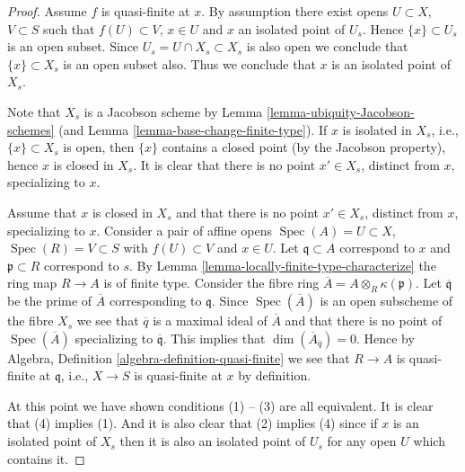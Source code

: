 \documentclass[10pt,a4paper]{amsart}
\theoremstyle{plain}
\theoremstyle{definition}
\theoremstyle{remark}
\numberwithin{equation}{subsection}
\def\Spec{\mathop{\mathrm{Spec}}}
\begin{document}
\begin{proof}
Assume $f$ is quasi-finite at $x$. By assumption there exist opens
$U \subset X$, $V \subset S$ such that $f(U) \subset V$, $x \in U$
and $x$ an isolated point of $U_s$. Hence $\{x\} \subset U_s$ is an open
subset. Since $U_s = U \cap X_s \subset X_s$ is also open we conclude
that $\{x\} \subset X_s$ is an open subset also. Thus we conclude
that $x$ is an isolated point of $X_s$.

\medskip\noindent
Note that $X_s$ is a Jacobson scheme by
Lemma \ref{lemma-ubiquity-Jacobson-schemes}
(and
Lemma \ref{lemma-base-change-finite-type}).
If $x$ is isolated in $X_s$, i.e., $\{x\} \subset X_s$ is open,
then $\{x\}$ contains a closed point (by the Jacobson property), hence
$x$ is closed in $X_s$. It is clear that there is no point $x' \in X_s$,
distinct from $x$, specializing to $x$.

\medskip\noindent
Assume that $x$ is closed in $X_s$ and that there is no point $x' \in X_s$,
distinct from $x$, specializing to $x$. Consider a pair of affine opens
$\Spec(A) = U \subset X$, $\Spec(R) = V \subset S$ with
$f(U) \subset V$ and $x \in U$. Let $\mathfrak q \subset A$ correspond to
$x$ and $\mathfrak p \subset R$ correspond to $s$.
By Lemma \ref{lemma-locally-finite-type-characterize} the ring map
$R \to A$ is of finite type. Consider the fibre ring
$\overline{A} = A \otimes_R \kappa(\mathfrak p)$.
Let $\overline{\mathfrak q}$ be the prime of $\overline{A}$ corresponding
to $\mathfrak q$. Since $\Spec(\overline{A})$ is an open subscheme of
the fibre $X_s$ we see that $\overline{q}$ is a maximal ideal
of $\overline{A}$ and that there is no point of $\Spec(\overline{A})$
specializing to $\overline{\mathfrak q}$.
This implies that $\dim(\overline{A}_{\overline{q}}) = 0$.
Hence by
Algebra, Definition \ref{algebra-definition-quasi-finite}
we see that $R \to A$ is quasi-finite at $\mathfrak q$, i.e.,
$X \to S$ is quasi-finite at $x$ by definition.

\medskip\noindent
At this point we have shown conditions (1) -- (3) are all equivalent.
It is clear that (4) implies (1). And it is also clear that
(2) implies (4) since if $x$ is an isolated point of $X_s$
then it is also an isolated point of $U_s$ for any open $U$
which contains it.
\end{proof}
\end{document}
